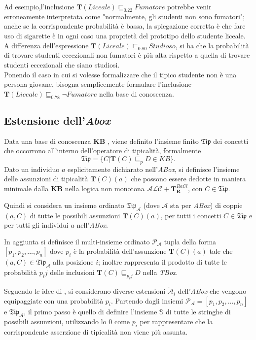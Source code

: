 Ad esempio,l’inclusione $ \mathbf{T}(Liceale) \sqsubseteq_{0.22} Fumatore  $  potrebbe venir erroneamente 
interpretata come "normalmente, gli studenti non sono fumatori"; anche se la corrispondente probabilità è bassa, 
la spiegazione corretta è che fare uso di sigarette è in ogni caso una 
proprietà del prototipo dello studente liceale.\\
A differenza dell'espressione $ \mathbf{T}(Liceale) \sqsubseteq_{0.80} Studioso $, si ha che la
probabilità di trovare studenti eccezionali non fumatori è più alta rispetto a quella
di trovare studenti eccezionali che siano studiosi.\\
Ponendo il caso in cui si volesse formalizzare che il tipico studente non è una persona giovane, bisogna 
semplicemente formulare l’inclusione $ \mathbf{T}(Liceale) \sqsubseteq_{0.78} \neg Fumatore  $ nella base di conoscenza.

\subsection{Estensione dell'\textit{Abox}}
Data una base di conoscenza \textbf{KB }, viene definito l’insieme finito $ \mathfrak{Tip} $ dei concetti che
occorrono all'interno dell'operatore di tipicalità, formalmente
\[ \mathfrak{Tip} = \{ C | \mathbf{T}(C) \sqsubseteq_{p} D \in KB \}. \]
Dato un individuo $ a $ esplicitamente dichiarato nell'\textit{ABox}, si definisce l’insieme delle
assunzioni di tipicalità $ \mathbf{T}(C)(a) $ che possono essere dedotte in maniera minimale dalla \textbf{KB}
nella logica non monotona $ \mathcal{ALC} + \mathbf{T}_{\mathbf{R}}^{\mathit{RaCl}} $, con $C \in \mathfrak{Tip}$.

Quindi si considera un insieme ordinato $ \mathfrak{Tip}_{\mathcal{A}}$ (dove $ \mathcal{A} $ sta per \textit{ABox})
di coppie $ (a, C) $ di tutte le possibili assunzioni $ \mathbf{T}(C)(a) $, 
per tutti i concetti $ C \in \mathfrak{Tip} $ e per tutti gli individui $ a $ nell'\textit{ABox}.

In aggiunta si definisce il multi-insieme ordinato $ \mathcal{P_{A}}$ tupla della forma $[p_1,p_2,...,p_n] $
dove $ p_i $ è la probabilità dell'assunzione $ \mathbf{T}(C)(a) $ tale che $ (a,C) \in 
\mathfrak{Tip}_{\mathcal{A}} $ alla posizione $ i $; inoltre rappresenta il prodotto di tutte le probabilità 
$ p_ij $ delle inclusioni $ \mathbf{T}(C) \sqsubseteq_{p_ij} D $ nella \textit{TBox}.

Seguendo le idee di \cite{ReasoningOnScen}, si considerano diverse estensioni $ \mathcal{\widetilde{A}}_i $
dell'\textit{ABox} che vengono equipaggiate con una probabilità $ p_i $. Partendo dagli insiemi  
$ \mathcal{P_{A}} = [p_1,p_2,...,p_n] $ e $ \mathfrak{Tip}_{\mathcal{A}}$, il primo passo è quello 
di definire l'insieme $ \mathbb{S} $ di tutte le stringhe di possibili assunzioni, utilizzando lo 0 come $ p_i $ per rappresentare che la corrispondente asserzione di tipicalità non viene più assunta.

